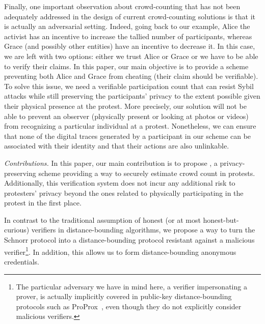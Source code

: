 Finally, one important observation about crowd-counting that has not been adequately addressed in the design of current crowd-counting solutions is that it is actually an adversarial setting. 
Indeed, going back to our example, Alice the activist has an incentive to increase the tallied number of participants, whereas Grace (and possibly other entities) have an incentive to decrease it.
In this case, we are left with two options: either we trust Alice or Grace or we have to be able to verify their claims.
In this paper, our main objective is to provide a scheme preventing both Alice and Grace from cheating (\ie their claim should be verifiable).
To solve this issue, we need a verifiable participation count that can resist Sybil attacks while still preserving the participants'
privacy to the extent possible given their physical presence at the protest. 
More precisely, our solution will not be able to prevent an observer (physically present or looking at photos or videos) from recognizing a particular individual at a protest. 
Nonetheless, we can ensure that none of the digital traces generated by a participant in our scheme can be associated with their identity and that their actions are also unlinkable.

\emph{Contributions.} In this paper, our main contribution is to propose \PRIVO, a privacy-preserving scheme providing a way to securely estimate crowd count in protests.
Additionally, this verification system does not incur any additional risk to protesters' privacy beyond the ones related to physically participating in the protest in the first place.

In contrast to the traditional assumption of honest (or at most honest-but-curious) verifiers in distance-bounding algorithms, we propose a way to turn the Schnorr protocol into a distance-bounding protocol resistant against a malicious verifier\footnote{The particular adversary we have in mind here, a verifier impersonating a prover, is actually implicitly covered in public-key distance-bounding protocols such as ProProx~\cite{ProProx}, even though they do not explicitly consider malicious verifiers.}.
In addition, this allows us to form distance-bounding anonymous credentials.

